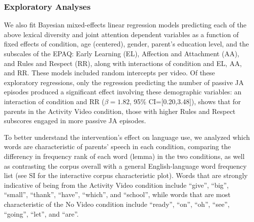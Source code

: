 \documentclass[man,floatsintext]{apa6}
\begin{document}
\hypertarget{exploratory-analyses}{%
\subsubsection{Exploratory Analyses}\label{exploratory-analyses}}

We also fit Bayesian mixed-effects linear regression models predicting each of the above lexical diversity and joint attention dependent variables as a function of fixed effects of condition, age (centered), gender, parent's education level, and the subscales of the EPAQ: Early Learning (EL), Affection and Attachment (AA), and Rules and Respect (RR), along with interactions of condition and EL, AA, and RR.
These models included random intercepts per video.
Of these exploratory regressions, only the regression predicting the number of passive JA episodes produced a significant effect involving these demographic variables: an interaction of condition and RR (\(\beta=1.82\), 95\% CI={[}0.20,3.48{]}), shows that for parents in the Activity Video condition, those with higher Rules and Respect subscores engaged in more passive JA episodes.

To better understand the intervention's effect on language use, we analyzed which words are characteristic of parents' speech in each condition, comparing the differency in frequency rank of each word (lemma) in the two conditions, as well as contrasting the corpus overall with a general English-language word frequency list (see SI for the interactive corpus characteristic plot).
Words that are strongly indicative of being from the Activity Video condition include \enquote{give}, \enquote{big}, \enquote{small}, \enquote{thank}, \enquote{have}, \enquote{which}, and \enquote{school}, while words that are most characteristic of the No Video condition include \enquote{ready}, \enquote{on}, \enquote{oh}, \enquote{see}, \enquote{going}, \enquote{let}, and \enquote{are}.
\end{document}
